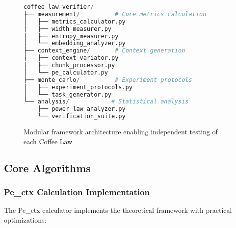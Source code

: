 \documentclass[conference]{IEEEtran}
\begin{document}
\begin{figure}[h]
\centering
\begin{lstlisting}[language=Python, basicstyle=\small]
coffee_law_verifier/
├── measurement/          # Core metrics calculation
│   ├── metrics_calculator.py
│   ├── width_measurer.py
│   ├── entropy_measurer.py
│   └── embedding_analyzer.py
├── context_engine/       # Context generation
│   ├── context_variator.py
│   ├── chunk_processor.py
│   └── pe_calculator.py
├── monte_carlo/          # Experiment protocols
│   ├── experiment_protocols.py
│   └── task_generator.py
└── analysis/            # Statistical analysis
    ├── power_law_analyzer.py
    └── verification_suite.py
\end{lstlisting}
\caption{Modular framework architecture enabling independent testing of each Coffee Law}
\label{fig:architecture}
\end{figure}

\subsection{Core Algorithms}

\subsubsection{Pe\_ctx Calculation Implementation}

The Pe\_ctx calculator implements the theoretical framework with practical optimizations:
\end{document}
